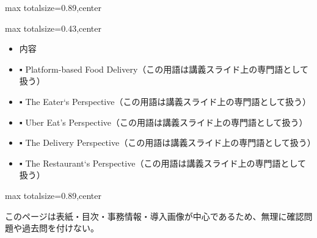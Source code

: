 \begin{minipage}[t]{0.58\textwidth}
\begin{adjustbox}{max totalsize={\textwidth}{0.89\textheight},center}
\begin{minipage}{\textwidth}
\end{minipage}
\end{adjustbox}
\end{minipage}


\clearpage
{}
\begin{minipage}[t]{0.405\textwidth}
\begin{adjustbox}{max totalsize={\textwidth}{0.43\textheight},center}
\begin{minipage}{\textwidth}\scriptsize
{}\begin{itemize}
\item 内容
\item ▪ Platform-based Food Delivery（この用語は講義スライド上の専門語として扱う）
\item ▪ The Eater‘s Perspective（この用語は講義スライド上の専門語として扱う）
\item ▪ Uber Eat’s Perspective（この用語は講義スライド上の専門語として扱う）
\item ▪ The Delivery Perspective（この用語は講義スライド上の専門語として扱う）
\item ▪ The Restaurant‘s Perspective（この用語は講義スライド上の専門語として扱う）
\end{itemize}
\end{minipage}
\end{adjustbox}
\end{minipage}\hfill
\begin{minipage}[t]{0.58\textwidth}
\begin{adjustbox}{max totalsize={\textwidth}{0.89\textheight},center}
\begin{minipage}{\textwidth}\scriptsize
{}このページは表紙・目次・事務情報・導入画像が中心であるため、無理に確認問題や過去問を付けない。
\end{minipage}
\end{adjustbox}
\end{minipage}


